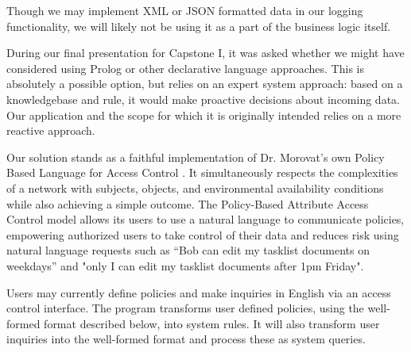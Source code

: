 \documentclass[12pt]{article}
\begin{document}
Though we may implement XML or JSON formatted data in our logging functionality, we will likely not be using it as a part of the business logic itself.

During our final presentation for Capstone I, it was asked whether we might have considered using Prolog or other declarative language approaches. This is absolutely a possible option, but relies on an expert system approach: based on a knowledgebase and rule, it would make proactive decisions about incoming data. Our application and the scope for which it is originally intended relies on a more reactive approach. 

Our solution stands as a faithful implementation of Dr. Morovat's own Policy Based Language for Access Control \cite{morovat16}. It simultaneously respects the complexities of a network with subjects, objects, and environmental availability conditions while also achieving a simple outcome. The Policy-Based Attribute Access Control model allows its users to use a natural language to communicate policies, empowering authorized users to take control of their data and reduces risk using natural language requests such as “Bob can edit my tasklist documents on weekdays” and "only I can edit my tasklist documents after 1pm Friday".

Users may currently define policies and make inquiries in English via an access control interface. The program transforms user defined policies, using the well-formed format described below, into system rules. It will also transform user inquiries into the well-formed format and process these as system queries.
\end{document}
